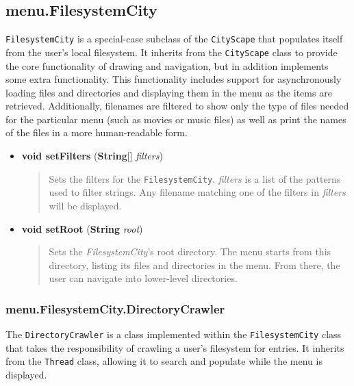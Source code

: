 \documentclass[letterpaper, titlepage, 11pt]{article}
\begin{document}
\subsection{menu.FilesystemCity}
\texttt{FilesystemCity} is a special-case subclass of the \texttt{CityScape} that
populates itself from the user's local filesystem.  It inherits from the
\texttt{CityScape} class to provide the core functionality of drawing and
navigation, but in addition implements some extra functionality.  This functionality
includes support for asynchronously loading files and directories and displaying
them in the menu as the items are retrieved.  Additionally, filenames are filtered
to show only the type of files needed for the particular menu (such as movies or
music files) as well as print the names of the files in a more human-readable form.

\begin{itemize}
\item[] \textbf{void setFilters} (\textbf{String}[] \textit{filters})
\begin{quotation}
Sets the filters for the \texttt{FilesystemCity}. \textit{filters} is a list of
the patterns used to filter strings. Any filename matching one of the filters in
\textit{filters} will be displayed.
\end{quotation}

\item[] \textbf{void setRoot} (\textbf{String} \textit{root})
\begin{quotation}
Sets the \textit{FilesystemCity}'s root directory.  The menu starts from this directory,
listing its files and directories in the menu.  From there, the user can navigate into
lower-level directories.
\end{quotation}
\end{itemize}

\subsubsection{menu.FilesystemCity.DirectoryCrawler}
The \texttt{DirectoryCrawler} is a class implemented within the \texttt{FilesystemCity}
class that takes the responsibility of crawling a user's filesystem for entries.  It
inherits from the \texttt{Thread} class, allowing it to search and populate while the menu is
displayed.
\end{document}
